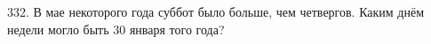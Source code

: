 332. В мае некоторого года суббот было больше, чем четвергов. Каким днём недели могло быть 30 января того года?\\

